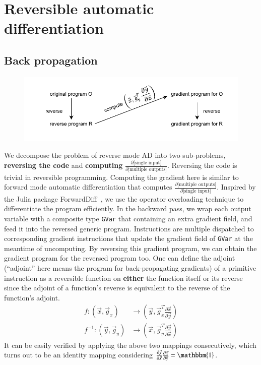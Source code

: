 \documentclass{article}
\newcommand{\<}{\langle}
\renewcommand{\>}{\rangle}
\renewcommand{\cite}[1]{{\citep{#1}}}
\theoremstyle{definition}\newtheorem{definition}{\textit{Definition}}
\begin{document}
\section{Reversible automatic differentiation}\label{sec:bp}

\subsection{Back propagation}
\begin{figure}[h!]
    \centerline{\includegraphics[width=0.8\columnwidth,trim={0 0cm 0 0},clip]{autodiff.pdf}}
\end{figure}
We decompose the problem of reverse mode AD into two sub-problems, \textbf{reversing the code} and \textbf{computing} $\frac{\partial \text{[single input]}}{\partial \text{[multiple outputs]}}$.
Reversing the code is trivial in reversible programming. Computing the gradient here is similar to forward mode automatic differentiation that computes $\frac{\partial \text{[multiple outputs]}}{\partial \text{[single input]}}$.
Inspired by the Julia package ForwardDiff~\cite{Revels2016}, we use the operator overloading technique to differentiate the program efficiently.
In the backward pass, we wrap each output variable with a composite type \texttt{GVar} that containing an extra gradient field, and feed it into the reversed generic program.
Instructions are multiple dispatched to corresponding gradient instructions that update the gradient field of \texttt{GVar} at the meantime of uncomputing. By reversing this gradient program, we can obtain the gradient program for the reversed program too.
One can define the adjoint (``adjoint'' here means the program for back-propagating gradients) of a primitive instruction as a reversible function on \textbf{either} the function itself or its reverse since the adjoint of a function's reverse is equivalent to the reverse of the function's adjoint.
\begin{align}
    f: (\vec x, \vec g_x) &\rightarrow (\vec y, \vec g_x^T\frac{\partial \vec x}{\partial \vec y})\\
    f^{-1}: (\vec y, \vec g_y) &\rightarrow (\vec x, \vec g_y^T\frac{\partial \vec y}{\partial \vec x})
\end{align}
It can be easily verified by applying the above two mappings consecutively, which turns out to be an identity mapping considering $\frac{\partial \vec y}{\partial \vec x} \frac{\partial \vec x}{\partial \vec y} = \mathbbm{1}$.
\end{document}
